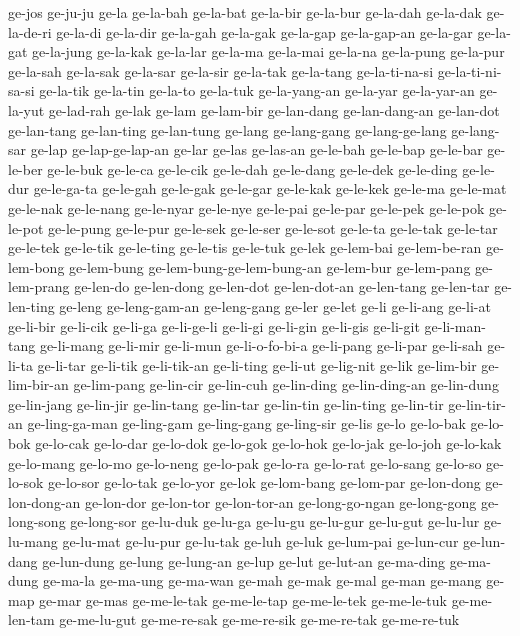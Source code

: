 {ge-jos ge-ju-ju ge-la ge-la-bah ge-la-bat ge-la-bir ge-la-bur ge-la-dah
ge-la-dak ge-la-de-ri ge-la-di ge-la-dir ge-la-gah ge-la-gak ge-la-gap
ge-la-gap-an ge-la-gar ge-la-gat ge-la-jung ge-la-kak ge-la-lar ge-la-ma
ge-la-mai ge-la-na ge-la-pung ge-la-pur ge-la-sah ge-la-sak ge-la-sar
ge-la-sir ge-la-tak ge-la-tang ge-la-ti-na-si ge-la-ti-ni-sa-si ge-la-tik
ge-la-tin ge-la-to ge-la-tuk ge-la-yang-an ge-la-yar ge-la-yar-an
ge-la-yut ge-lad-rah ge-lak ge-lam ge-lam-bir ge-lan-dang ge-lan-dang-an
ge-lan-dot ge-lan-tang ge-lan-ting ge-lan-tung ge-lang ge-lang-gang
ge-lang-ge-lang ge-lang-sar ge-lap ge-lap-ge-lap-an ge-lar ge-las
ge-las-an ge-le-bah ge-le-bap ge-le-bar ge-le-ber ge-le-buk ge-le-ca
ge-le-cik ge-le-dah ge-le-dang ge-le-dek ge-le-ding ge-le-dur ge-le-ga-ta
ge-le-gah ge-le-gak ge-le-gar ge-le-kak ge-le-kek ge-le-ma ge-le-mat
ge-le-nak ge-le-nang ge-le-nyar ge-le-nye ge-le-pai ge-le-par ge-le-pek
ge-le-pok ge-le-pot ge-le-pung ge-le-pur ge-le-sek ge-le-ser ge-le-sot
ge-le-ta ge-le-tak ge-le-tar ge-le-tek ge-le-tik ge-le-ting ge-le-tis
ge-le-tuk ge-lek ge-lem-bai ge-lem-be-ran ge-lem-bong ge-lem-bung
ge-lem-bung-ge-lem-bung-an ge-lem-bur ge-lem-pang ge-lem-prang ge-len-do
ge-len-dong ge-len-dot ge-len-dot-an ge-len-tang ge-len-tar ge-len-ting
ge-leng ge-leng-gam-an ge-leng-gang ge-ler ge-let ge-li ge-li-ang ge-li-at
ge-li-bir ge-li-cik ge-li-ga ge-li-ge-li ge-li-gi ge-li-gin ge-li-gis
ge-li-git ge-li-man-tang ge-li-mang ge-li-mir ge-li-mun ge-li-o-fo-bi-a
ge-li-pang ge-li-par ge-li-sah ge-li-ta ge-li-tar ge-li-tik ge-li-tik-an
ge-li-ting ge-li-ut ge-lig-nit ge-lik ge-lim-bir ge-lim-bir-an ge-lim-pang
ge-lin-cir ge-lin-cuh ge-lin-ding ge-lin-ding-an ge-lin-dung ge-lin-jang
ge-lin-jir ge-lin-tang ge-lin-tar ge-lin-tin ge-lin-ting ge-lin-tir
ge-lin-tir-an ge-ling-ga-man ge-ling-gam ge-ling-gang ge-ling-sir ge-lis
ge-lo ge-lo-bak ge-lo-bok ge-lo-cak ge-lo-dar ge-lo-dok ge-lo-gok
ge-lo-hok ge-lo-jak ge-lo-joh ge-lo-kak ge-lo-mang ge-lo-mo ge-lo-neng
ge-lo-pak ge-lo-ra ge-lo-rat ge-lo-sang ge-lo-so ge-lo-sok ge-lo-sor
ge-lo-tak ge-lo-yor ge-lok ge-lom-bang ge-lom-par ge-lon-dong
ge-lon-dong-an ge-lon-dor ge-lon-tor ge-lon-tor-an ge-long-go-ngan
ge-long-gong ge-long-song ge-long-sor ge-lu-duk ge-lu-ga ge-lu-gu
ge-lu-gur ge-lu-gut ge-lu-lur ge-lu-mang ge-lu-mat ge-lu-pur ge-lu-tak
ge-luh ge-luk ge-lum-pai ge-lun-cur ge-lun-dang ge-lun-dung ge-lung
ge-lung-an ge-lup ge-lut ge-lut-an ge-ma-ding ge-ma-dung ge-ma-la
ge-ma-ung ge-ma-wan ge-mah ge-mak ge-mal ge-man ge-mang ge-map ge-mar
ge-mas ge-me-le-tak ge-me-le-tap ge-me-le-tek ge-me-le-tuk ge-me-len-tam
ge-me-lu-gut ge-me-re-sak ge-me-re-sik ge-me-re-tak ge-me-re-tuk
}
